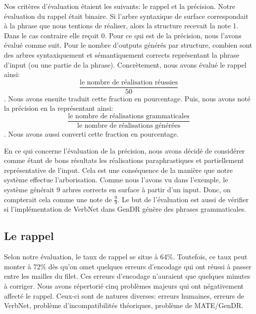 
Nos critères d'évaluation étaient les suivants: le rappel et la précision. Notre évaluation du rappel était binaire. Si l'arbre syntaxique de surface correspondait à la phrase que nous tentions de réaliser, alors la structure recevait la note 1. Dans le cas contraire elle reçoit 0. Pour ce qui est de la précision, nous l'avons évalué comme suit. Pour le nombre d'outputs générés par structure, combien sont des arbres syntaxiquement et sémantiquement corrects représentant la phrase d'input (ou une partie de la phrase). Concrètement, nous avons évalué le rappel ainsi: \[\frac{\text{le nombre de réalisation réussies}}{50}\]. Nous avons ensuite traduit cette fraction en pourcentage. Puis, nous avons noté la précision en la représentant ainsi:\[\frac{\text{le nombre de réalisations grammaticales}}{\text{le nombre de réalisations générées}}\]. Nous avons aussi converti cette fraction en pourcentage.

En ce qui concerne l'évaluation de la précision, nous avons décidé de considérer comme étant de bons résultats les réalisations paraphrastiques et partiellement représentative de l'input. Cela est une conséquence de la manière que notre système effectue l'arborisation. Comme nous l'avons vu dans l'exemple, le système générait 9 arbres corrects en surface à partir d'un input. Donc, on compterait cela comme une note de \( \frac{9}{9} \). Le but de l'évaluation est aussi de vérifier si l'implémentation de VerbNet dans GenDR génère des phrases grammaticales.
                              
\subsection{Le rappel}

Selon notre évaluation, le taux de rappel se situe à 64\%. Toutefois, ce taux peut monter à 72\% dès qu'on omet quelques erreurs d'encodage qui ont réussi à passer entre les mailles du filet. Ces erreurs d'encodage n'auraient que quelques minutes à corriger. Nous avons répertorié cinq problèmes majeurs qui ont négativement affecté le rappel. Ceux-ci sont de natures diverses: erreurs humaines, erreurs de VerbNet, problème d'incompatibilités théoriques, problème de MATE/GenDR.

